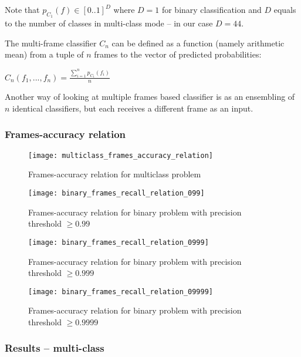     Note that $p_{C_{1}}(f) \in [0..1]^D$ where $D = 1$ for binary classification
    and $D$ equals to the number of classes in multi-class mode -- in our case $D = 44$.


    The multi-frame classifier $C_{n}$ can be defined as a function (namely arithmetic mean)
    from a tuple of $n$ frames to the vector of predicted probabilities:

    \begin{center}
    $C_{n}(f_1, ..., f_n) = \frac{\sum\limits_{i=1}^{n}{p_{C_{1}}(f_{i})}}{n}$
    \end{center}

    Another way of looking at multiple frames based classifier is as an ensembling
    of $n$ identical classifiers, but each receives a different frame as an input.

    \subsubsection{Frames-accuracy relation}
    \begin{figure}[H]
    \caption{Frames-accuracy relation for multiclass problem}
    \centering
    \texttt{[image: multiclass\_frames\_accuracy\_relation]}
    \end{figure}

    \begin{figure}[H]
    \caption{Frames-accuracy relation for binary problem with precision threshold $\geqslant 0.99$}
    \centering
    \texttt{[image: binary\_frames\_recall\_relation\_099]}
    \end{figure}

    \begin{figure}[H]
    \caption{Frames-accuracy relation for binary problem with precision threshold $\geqslant 0.999$}
    \centering
    \texttt{[image: binary\_frames\_recall\_relation\_0999]}
    \end{figure}

    \begin{figure}[H]
    \caption{Frames-accuracy relation for binary problem with precision threshold $\geqslant 0.9999$}
    \centering
    \texttt{[image: binary\_frames\_recall\_relation\_09999]}
    \end{figure}

    \subsubsection{Results -- multi-class}

